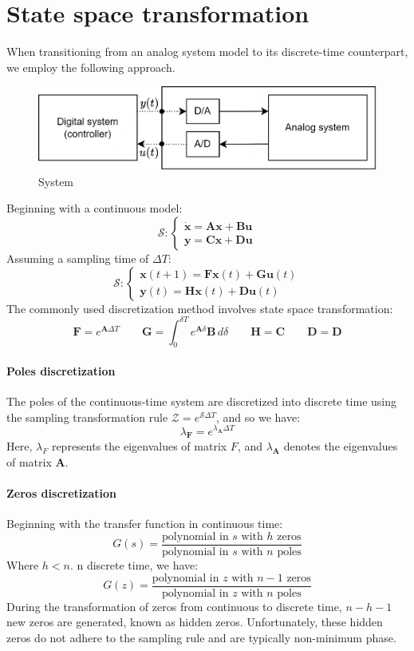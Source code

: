 \section{State space transformation}

When transitioning from an analog system model to its discrete-time counterpart, we employ the following approach. 
\begin{figure}[H]
    \centering
    \includegraphics[width=0.5\linewidth]{images/sys.png}
    \caption{System}
\end{figure}
Beginning with a continuous model:
\[\mathcal{S}:\begin{cases} \dot{\mathbf{x}}=\mathbf{Ax}+\mathbf{Bu} \\ \mathbf{y}=\mathbf{Cx}+\mathbf{Du} \end{cases}\]
Assuming a sampling time of $\Delta T$: 
\[\mathcal{S}:\begin{cases} \mathbf{x}(t+1)=\mathbf{Fx}(t)+\mathbf{Gu}(t) \\ \mathbf{y}(t)=\mathbf{Hx}(t)+\mathbf{Du}(t) \end{cases}\]
The commonly used discretization method involves state space transformation:
\[\mathbf{F}=e^{\mathbf{A}\Delta T} \qquad \mathbf{G}=\int_0^{\delta T}e^{\mathbf{A}\delta}\mathbf{B} \,d\delta\qquad \mathbf{H}=\mathbf{C} \qquad \mathbf{D}=\mathbf{D}\]

\paragraph*{Poles discretization}
The poles of the continuous-time system are discretized into discrete time using the sampling transformation rule $\mathcal{Z}=e^{\mathcal{S}\Delta T}$, and so we have: 
\[\lambda_\mathbf{F}=e^{\lambda_\mathbf{A}\Delta T}\]
Here, $\lambda_F$ represents the eigenvalues of matrix $F$, and $\lambda_\mathbf{A}$ denotes the eigenvalues of matrix $\mathbf{A}$.

\paragraph*{Zeros discretization}
Beginning with the transfer function in continuous time:
\[G(s)=\dfrac{\text{polynomial in }s\text{ with }h \text{ zeros}}{\text{polynomial in }s\text{ with }n \text{ poles}}\]
Where $h<n$. 
n discrete time, we have:
\[G(z)=\dfrac{\text{polynomial in }z\text{ with }n-1 \text{ zeros}}{\text{polynomial in }z\text{ with }n \text{ poles}}\]
During the transformation of zeros from continuous to discrete time, $n-h-1$ new zeros are generated, known as hidden zeros.
Unfortunately, these hidden zeros do not adhere to the sampling rule and are typically non-minimum phase.